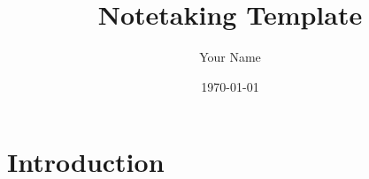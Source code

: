 \documentclass[11pt,a4paper]{article}
\title{Notetaking Template}
\author{Your Name}
\date{\today}
\begin{document}
\maketitle

\section{Introduction}
\end{document}
